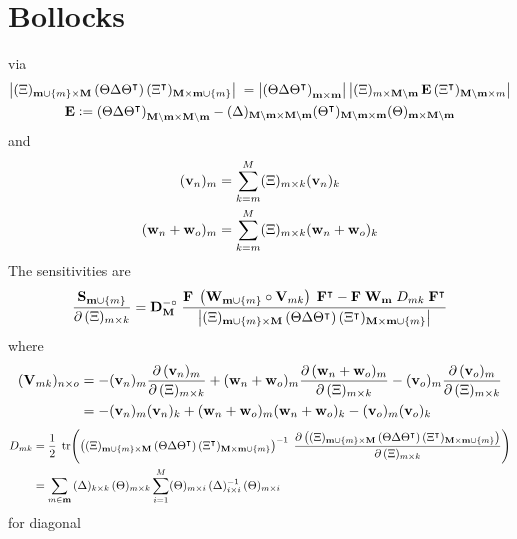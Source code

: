 \documentclass[a4paper, margin=1in, reqno]{RAMArticle}
\DeclareMathOperator{\tr}{tr}
\begin{document}
\section{Bollocks}
via
\begin{gather*}
	{\ensuremath{\left\lvert(\Xi)_{\mathbf{m}\cup\left\lbrace m\right\rbrace\times\mathbf{M}}\left(\Theta\Delta\Theta^{\intercal}\right)(\Xi^{\intercal})_{\mathbf{M}\times\mathbf{m}\cup\left\lbrace m\right\rbrace}\right\rvert}} \phantom{:}= 
	\left\lvert\left(\Theta\Delta\Theta^{\intercal}\right)_{\mathbf{m}\times\mathbf{m}}\right\rvert
	\left\lvert(\Xi)_{m\times\mathbf{M}\setminus\mathbf{m}}\, \mathbf{E} \, (\Xi^{\intercal})_{\mathbf{M}\setminus\mathbf{m}\times m}\right\rvert \\
	\mathbf{E} \mathrel{\mathop:}= 
		\left(\Theta\Delta\Theta^{\intercal}\right)_{\mathbf{M}\setminus\mathbf{m}\times\mathbf{M}\setminus\mathbf{m}}
		- (\Delta)_{\mathbf{M}\setminus\mathbf{m}\times\mathbf{M}\setminus\mathbf{m}}
		(\Theta^{\intercal})_{\mathbf{M}\setminus\mathbf{m}\times\mathbf{m}}
		(\Theta)_{\mathbf{m}\times\mathbf{M}\setminus\mathbf{m}}
\end{gather*}
and
\begin{align*}
	(\mathbf{v}_n)_{m}
		&= \sum_{k=m}^{M} (\Xi)_{m\times k} (\mathbf{v}_n)_{k} \\
	(\mathbf{w}_n+\mathbf{w}_o)_{m}
		&= \sum_{k=m}^{M} (\Xi)_{m\times k} (\mathbf{w}_n+\mathbf{w}_o)_{k} 
\end{align*}
The sensitivities are
\begin{equation*}
	\frac{\mathbf{S}_{\mathbf{m}\cup\left\lbrace m\right\rbrace}}{\partial\,(\Xi)_{m \times k}}
	 = \mathbf{D}_{\mathbf{M}}^{-\circ} \; \frac{
	 	\mathbf{F}\; \left(\mathbf{W}_{\mathbf{m}\cup\left\lbrace m\right\rbrace} \circ \mathbf{V}_{mk}\right)\; \mathbf{F}^{\intercal}
	 	- \mathbf{F}\; \mathbf{W}_{\mathbf{m}}\; D_{mk} \; \mathbf{F}^{\intercal}}
	 	{\left\lvert(\Xi)_{\mathbf{m}\cup\left\lbrace m\right\rbrace\times\mathbf{M}}\left(\Theta\Delta\Theta^{\intercal}\right)(\Xi^{\intercal})_{\mathbf{M}\times\mathbf{m}\cup\left\lbrace m\right\rbrace}\right\rvert}
	\end{equation*}
where
\begin{align*}
	(\mathbf{V}_{mk})_{n \times o} 
		&= - (\mathbf{v}_{n})_{m}\frac{\partial\,(\mathbf{v}_{n})_{m}} {\partial\,(\Xi)_{m \times k}} 
			+ (\mathbf{w}_{n} + \mathbf{w}_{o})_{m}
			\frac{\partial\,(\mathbf{w}_{n} + \mathbf{w}_{o})_{m}} {\partial\,(\Xi)_{m \times k}} 
			-(\mathbf{v}_{o})_{m}\frac{\partial\,(\mathbf{v}_{o})_{m}} {\partial\,(\Xi)_{m \times k}} \\
		&=	- (\mathbf{v}_{n})_{m}(\mathbf{v}_{n})_{k} 
			+(\mathbf{w}_{n} + \mathbf{w}_{o})_{m}(\mathbf{w}_{n} + \mathbf{w}_{o})_{k}
			- (\mathbf{v}_{o})_{m}(\mathbf{v}_{o})_{k} 
\end{align*}
\begin{align*}
	D_{mk} &=
		\frac{1}{2}\;\tr\!\left(
			\left(
				(\Xi)_{\vr{m}\cup\set{m}\times\vr{M}}\left(\Theta\Delta\Theta^{\intercal}\right)(\Xi^{\intercal})_{\vr{M}\times\vr{m}\cup\set{m}}
			\right)^{-1}
			\; \frac{\partial
			\left(
				(\Xi)_{\vr{m}\cup\set{m}\times\vr{M}}\left(\Theta\Delta\Theta^{\intercal}\right)(\Xi^{\intercal})_{\vr{M}\times\vr{m}\cup\set{m}}
			\right)}
			{\partial\,(\Xi)_{m \times k}}
		\right) \\
		&= 
		\sum_{m\in\vr{m}} \, (\Delta)_{k \times k} \, (\Theta)_{m \times k}
		\sum_{i=1}^{M} (\Theta)_{m \times i} \, (\Delta)_{i \times i}^{-1} \, (\Theta)_{m \times i}
\end{align*}
for diagonal
\begin{equation*}
\end{equation*}
\end{document}
